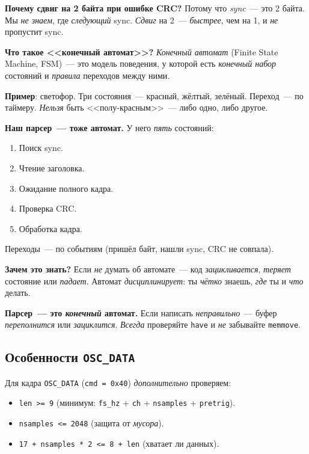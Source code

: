 \begin{keybox}
\textbf{Почему сдвиг на 2 байта при ошибке CRC?}
Потому что \emph{sync}~--- это 2 байта. Мы \emph{не знаем},
где \emph{следующий} sync. \emph{Сдвиг} на 2~---
\emph{быстрее}, чем на 1, и \emph{не} пропустит sync.
\end{keybox}

\begin{ideabox}
\textbf{Что такое <<конечный автомат>>?} \emph{Конечный
автомат} (Finite State Machine, FSM)~--- это модель
поведения, у которой есть \emph{конечный набор} состояний
и \emph{правила} переходов между ними.

\textbf{Пример}: светофор. Три состояния~--- красный,
жёлтый, зелёный. Переход~--- по таймеру. \emph{Нельзя}
быть <<полу-красным>>~--- либо одно, либо другое.

\textbf{Наш парсер~--- тоже автомат.} У него \emph{пять}
состояний:
\begin{enumerate}
    \item Поиск sync.
    \item Чтение заголовка.
    \item Ожидание полного кадра.
    \item Проверка CRC.
    \item Обработка кадра.
\end{enumerate}
Переходы~--- по событиям (пришёл байт, нашли sync,
CRC не совпала).

\textbf{Зачем это знать?} Если \emph{не} думать об
автомате~--- код \emph{зацикливается}, \emph{теряет}
состояние или \emph{падает}. Автомат \emph{дисциплинирует}:
ты \emph{чётко} знаешь, \emph{где} ты и \emph{что} делать.
\end{ideabox}

\begin{warnbox}
\textbf{Парсер~--- это \emph{конечный} автомат.} Если
написать \emph{неправильно}~--- буфер \emph{переполнится}
или \emph{зациклится}. \emph{Всегда} проверяйте \texttt{have}
и \emph{не} забывайте \texttt{memmove}.
\end{warnbox}

\subsection{Особенности \texttt{OSC\_DATA}}

Для кадра \texttt{OSC\_DATA} (\texttt{cmd = 0x40}) \emph{дополнительно}
проверяем:
\begin{itemize}
    \item \texttt{len >= 9} (минимум: \texttt{fs\_hz} + \texttt{ch} +
          \texttt{nsamples} + \texttt{pretrig}).
    \item \texttt{nsamples <= 2048} (защита от \emph{мусора}).
    \item \texttt{17 + nsamples * 2 <= 8 + len} (хватает ли
          данных).
\end{itemize}

